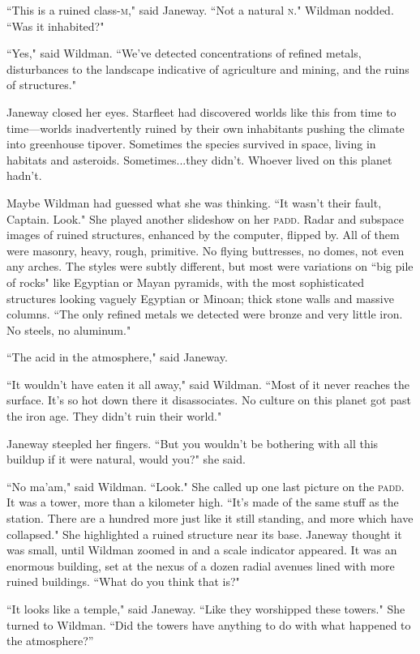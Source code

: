 \documentclass[twoside,letterpaper,12pt]{memoir}
\begin{document}
``This is a ruined class-\textsc{m}," said Janeway. ``Not a natural \textsc{n}." Wildman nodded. ``Was it inhabited?"

``Yes," said Wildman. ``We've detected concentrations of refined metals, disturbances to the landscape indicative of agriculture and mining, and the ruins of structures."

Janeway closed her eyes. Starfleet had discovered worlds like this from time to time---worlds inadvertently ruined by their own inhabitants pushing the climate into greenhouse tipover. Sometimes the species survived in space, living in habitats and asteroids. Sometimes...they didn't. Whoever lived on this planet hadn't.

Maybe Wildman had guessed what she was thinking. ``It wasn't their fault, Captain. Look." She played another slideshow on her \textsc{padd}. Radar and subspace images of ruined structures, enhanced by the computer, flipped by. All of them were masonry, heavy, rough, primitive. No flying buttresses, no domes, not even any arches. The styles were subtly different, but most were variations on ``big pile of rocks" like Egyptian or Mayan pyramids, with the most sophisticated structures looking vaguely Egyptian or Minoan; thick stone walls and massive columns. ``The only refined metals we detected were bronze and very little iron. No steels, no aluminum."

``The acid in the atmosphere," said Janeway.

``It wouldn't have eaten it all away," said Wildman. ``Most of it never reaches the surface. It's so hot down there it disassociates. No culture on this planet got past the iron age. They didn't ruin their world."

Janeway steepled her fingers. ``But you wouldn't be bothering with all this buildup if it were natural, would you?" she said.

``No ma'am," said Wildman. ``Look." She called up one last picture on the \textsc{padd}. It was a tower, more than a kilometer high. ``It's made of the same stuff as the station. There are a hundred more just like it still standing, and more which have collapsed." She highlighted a ruined structure near its base. Janeway thought it was small, until Wildman zoomed in and a scale indicator appeared. It was an enormous building, set at the nexus of a dozen radial avenues lined with more ruined buildings. ``What do you think that is?"

``It looks like a temple," said Janeway. ``Like they worshipped these towers." She turned to Wildman. ``Did the towers have anything to do with what happened to the atmosphere?''
\end{document}
